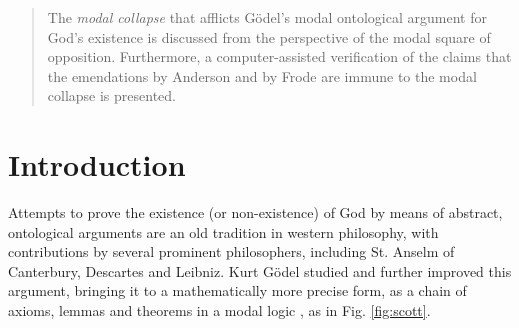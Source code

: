 \documentclass{birkjour}
\theoremstyle{definition}
\theoremstyle{remark}
\numberwithin{equation}{section}
\begin{document}
\date{August 30, 2014}
\dedicatory{ }

\begin{abstract}
The \emph{modal collapse} that afflicts G\"odel's modal ontological 
argument for God's existence is discussed from the perspective of the 
modal square of opposition. Furthermore, a computer-assisted verification 
of the claims that the emendations by Anderson and by Frode are immune to 
the modal collapse is presented.
\end{abstract}

\maketitle
\section{Introduction}

Attempts to prove the
existence (or non-existence) of God by means of abstract, ontological
arguments are an old tradition in western philosophy, with contributions by several prominent philosophers, including St. Anselm of
Canterbury, Descartes and Leibniz. Kurt G{\"o}del studied and further improved this argument, bringing it to a mathematically more precise form, as a chain of axioms, lemmas and theorems in a modal logic \cite{GoedelNotes,ScottNotes}, as in Fig. \ref{fig:scott}.
\end{document}
